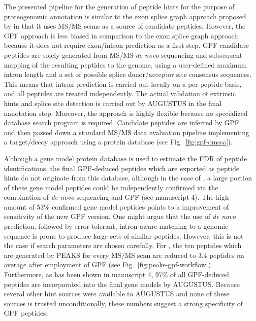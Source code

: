 The presented pipeline for the generation of peptide hints for the purpose of
proteogenomic annotation is similar to the exon splice graph approach proposed
by \citeauthor{Tanner2007} in that it uses MS/MS scans as a source of candidate
peptides.
However, the GPF approach is less biased in comparison to the exon splice graph
approach because it does not require exon/intron prediction as a first step.
GPF candidate peptides are solely generated from MS/MS {\em de novo} sequencing
and subsequent mapping of the resulting peptides to the genome, using a 
user-defined maximum intron length and a set of possible splice donor/acceptor 
site consensus sequences.
This means that intron prediction is carried out locally on a per-peptide 
basis, and all peptides are treated independently.
The actual validation of extrinsic hints and splice site detection is
carried out by AUGUSTUS in the final annotation step.
Moreover, the approach is highly flexible because no specialized database
search program is required.
Candidate peptides are inferred by GPF and then passed down a standard MS/MS 
data evaluation pipeline implementing a target/decoy approach using a protein
database (see Fig.~\ref{fig:gpf-omssa}).


Although a gene model protein database is used to estimate the FDR of peptide 
identifications, the final GPF-deduced peptides which are exported as
peptide hints do not originate from this database, although in the case
of \cre, a large portion of these gene model peptides could be 
independently confirmed via the combination of {\em de novo} sequencing and 
GPF (see manuscript 4).
The high amount of 53\% confirmed gene model peptides points to a improvement 
of sensitivity of the new GPF version.
One might argue that the use of {\em de novo} prediction, followed by
error-tolerant, intron-aware matching to a genomic sequence is prone to
produce large sets of similar peptides.
However, this is not the case if search parameters are chosen carefully.
For \cre, the ten peptides which are generated by PEAKS for every MS/MS scan 
are reduced to 3.4 peptides on average after employment of GPF 
(see Fig.~\ref{fig:peaks-gpf-workflow}).
Furthermore, as has been shown in manuscript 4, 97\% of all GPF-deduced 
peptides are incorporated into the final gene models by AUGUSTUS.
Because several other hint sources were available to AUGUSTUS and none of
these sources is trusted unconditionally, these numbers suggest a strong 
specificity of GPF peptides.

